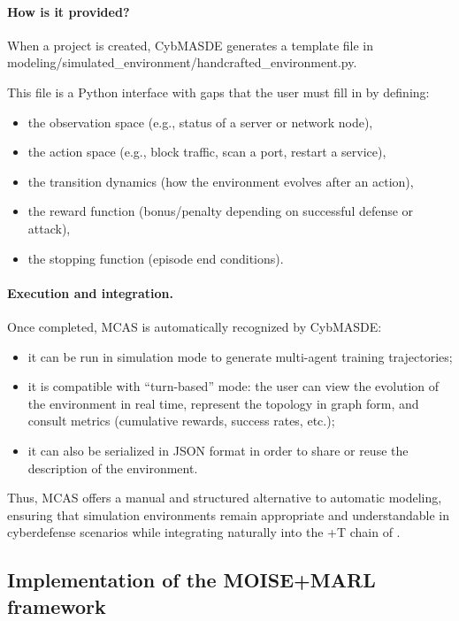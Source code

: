 \paragraph{How is it provided?}
When a project is created, CybMASDE generates a template file in modeling/simulated_environment/handcrafted_environment.py.

This file is a Python interface with gaps that the user must fill in by defining:
\begin{itemize}
  \item the observation space (e.g., status of a server or network node),
  \item the action space (e.g., block traffic, scan a port, restart a service),
  \item the transition dynamics (how the environment evolves after an action),
  \item the reward function (bonus/penalty depending on successful defense or attack),
  \item the stopping function (episode end conditions).
\end{itemize}

\paragraph{Execution and integration.}
Once completed, MCAS is automatically recognized by CybMASDE:
\begin{itemize}
  \item it can be run in simulation mode to generate multi-agent training trajectories;
  \item it is compatible with “turn-based” mode: the user can view the evolution of the environment in real time, represent the topology in graph form, and consult metrics (cumulative rewards, success rates, etc.);
  \item it can also be serialized in JSON format in order to share or reuse the description of the environment.
\end{itemize}

Thus, MCAS offers a manual and structured alternative to automatic modeling, ensuring that simulation environments remain appropriate and understandable in cyberdefense scenarios while integrating naturally into the +T chain of .


\subsection{Implementation of the MOISE+MARL framework}

